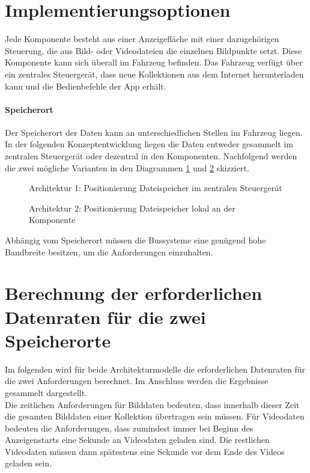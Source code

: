 \section{Implementierungsoptionen}
Jede Komponente besteht aus einer Anzeigefläche mit einer dazugehörigen Steuerung, die aus Bild- oder Videodateien die einzelnen Bildpunkte setzt. Diese Komponente kann sich überall im Fahrzeug befinden.
Das Fahrzeug verfügt über ein zentrales Steuergerät, dass neue Kollektionen aus dem Internet herunterladen kann und die Bedienbefehle der App erhält.
\paragraph{Speicherort}
Der Speicherort der Daten kann an unterschiedlichen Stellen im Fahrzeug liegen. In der folgenden Konzeptentwicklung liegen die Daten entweder gesammelt im zentralen Steuergerät oder dezentral in den Komponenten. 
Nachfolgend werden die zwei mögliche Varianten in den Diagrammen \ref{fig:architektur1} und \ref{fig:architektur2} skizziert.
\begin{figure}[]
	\centering
	
	\caption[Architektur 1: Positionierung Dateispeicher im zentralen Steuergerät]{Architektur 1: Positionierung Dateispeicher im zentralen Steuergerät}
	\label{fig:architektur1}
\end{figure}
\begin{figure}[]
	\centering
	
	\caption[Architektur 2: Positionierung Dateispeicher lokal an der Komponente]{Architektur 2: Positionierung Dateispeicher lokal an der Komponente}
	\label{fig:architektur2}
\end{figure}
Abhängig vom Speicherort müssen die Bussysteme eine genügend hohe Bandbreite besitzen, um die Anforderungen einzuhalten. 
\section{Berechnung der erforderlichen Datenraten für die zwei Speicherorte}
Im folgenden wird für beide Architekturmodelle die erforderlichen Datenraten für die zwei Anforderungen berechnet. Im Anschluss werden die Ergebnisse gesammelt dargestellt. \\
Die zeitlichen Anforderungen für Bilddaten bedeuten, dass innerhalb dieser Zeit die gesamten Bilddaten einer Kollektion übertragen sein müssen. 
Für Videodaten bedeuten die Anforderungen, dass zumindest immer bei Beginn des Anzeigenstarts eine Sekunde an Videodaten geladen sind. Die restlichen Videodaten müssen dann spätestens eine Sekunde vor dem Ende des Videos geladen sein. 
